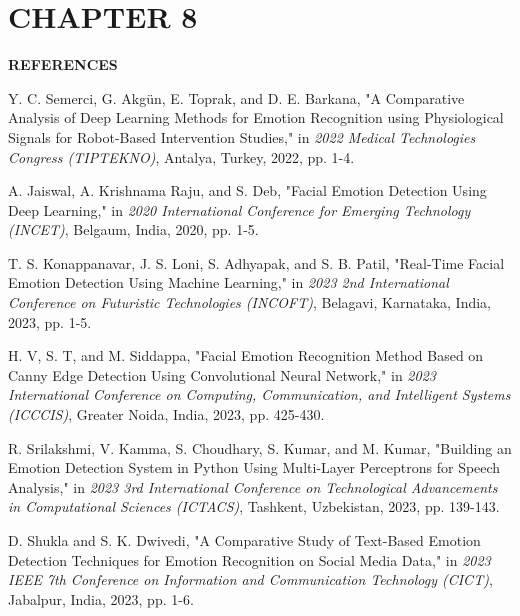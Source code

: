\documentclass[12pt]{report}
\begin{document}
\newpage
\label{conc}
\section*{CHAPTER 8}
\vspace{1em}
\begin{center}
    \textbf{\fontsize{16pt}{21.6pt}\selectfont REFERENCES}
\end{center}
\vspace{1em}
\begin{enumerate}[label={[\arabic*]}]
\item \label{conc1} Y. C. Semerci, G. Akgün, E. Toprak, and D. E. Barkana, "A Comparative Analysis of Deep Learning Methods for Emotion Recognition using Physiological Signals for Robot-Based Intervention Studies," in \textit{2022 Medical Technologies Congress (TIPTEKNO)}, Antalya, Turkey, 2022, pp. 1-4. 

\item \label{conc2} A. Jaiswal, A. Krishnama Raju, and S. Deb, "Facial Emotion Detection Using Deep Learning," in \textit{2020 International Conference for Emerging Technology (INCET)}, Belgaum, India, 2020, pp. 1-5. 

\item \label{conc3} T. S. Konappanavar, J. S. Loni, S. Adhyapak, and S. B. Patil, "Real-Time Facial Emotion Detection Using Machine Learning," in \textit{2023 2nd International Conference on Futuristic Technologies (INCOFT)}, Belagavi, Karnataka, India, 2023, pp. 1-5. 

\item \label{conc4} H. V, S. T, and M. Siddappa, "Facial Emotion Recognition Method Based on Canny Edge Detection Using Convolutional Neural Network," in \textit{2023 International Conference on Computing, Communication, and Intelligent Systems (ICCCIS)}, Greater Noida, India, 2023, pp. 425-430.

\item \label{conc5} R. Srilakshmi, V. Kamma, S. Choudhary, S. Kumar, and M. Kumar, "Building an Emotion Detection System in Python Using Multi-Layer Perceptrons for Speech Analysis," in \textit{2023 3rd International Conference on Technological Advancements in Computational Sciences (ICTACS)}, Tashkent, Uzbekistan, 2023, pp. 139-143. 

\item \label{conc6} D. Shukla and S. K. Dwivedi, "A Comparative Study of Text-Based Emotion Detection Techniques for Emotion Recognition on Social Media Data," in \textit{2023 IEEE 7th Conference on Information and Communication Technology (CICT)}, Jabalpur, India, 2023, pp. 1-6. 


\end{enumerate}
\end{document}
